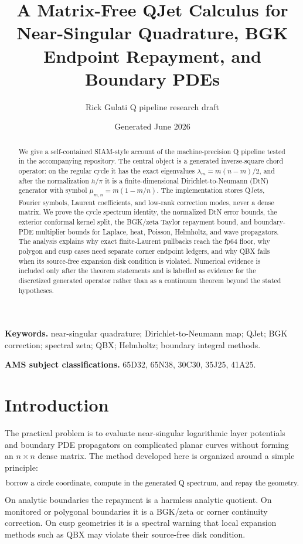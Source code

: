 \documentclass[10pt,leqno]{article}
\numberwithin{equation}{section}
\theoremstyle{plain}
\theoremstyle{definition}
\theoremstyle{remark}
\begin{document}
\title{\bf A Matrix-Free QJet Calculus for Near-Singular Quadrature, BGK Endpoint Repayment, and Boundary PDEs}
\author{Rick Gulati Q pipeline research draft}
\date{Generated June 2026}
\maketitle
\begin{abstract}
We give a self-contained SIAM-style account of the machine-precision Q pipeline tested in the accompanying repository.  The central object is a generated inverse-square chord operator: on the regular cycle it has the exact eigenvalues $\lambda_m=m(n-m)/2$, and after the normalization $h/\pi$ it is a finite-dimensional Dirichlet-to-Neumann (DtN) generator with symbol $\mu_{m,n}=m(1-m/n)$.  The implementation stores QJets, Fourier symbols, Laurent coefficients, and low-rank correction modes, never a dense matrix.  We prove the cycle spectrum identity, the normalized DtN error bounds, the exterior conformal kernel split, the BGK/zeta Taylor repayment bound, and boundary-PDE multiplier bounds for Laplace, heat, Poisson, Helmholtz, and wave propagators.  The analysis explains why exact finite-Laurent pullbacks reach the fp64 floor, why polygon and cusp cases need separate corner endpoint ledgers, and why QBX fails when its source-free expansion disk condition is violated.  Numerical evidence is included only after the theorem statements and is labelled as evidence for the discretized generated operator rather than as a continuum theorem beyond the stated hypotheses.
\end{abstract}
\textbf{Keywords.} near-singular quadrature; Dirichlet-to-Neumann map; QJet; BGK correction; spectral zeta; QBX; Helmholtz; boundary integral methods.

\textbf{AMS subject classifications.} 65D32, 65N38, 30C30, 35J25, 41A25.
\tableofcontents
\newpage
\section{Introduction}
The practical problem is to evaluate near-singular logarithmic layer potentials and boundary PDE propagators on complicated planar curves without forming an $n\times n$ dense matrix.  The method developed here is organized around a simple principle:
\[
\hbox{borrow a circle coordinate, compute in the generated Q spectrum, and repay the geometry.}
\]
On analytic boundaries the repayment is a harmless analytic quotient.  On monitored or polygonal boundaries it is a BGK/zeta or corner continuity correction.  On cusp geometries it is a spectral warning that local expansion methods such as QBX may violate their source-free disk condition.
\end{document}
